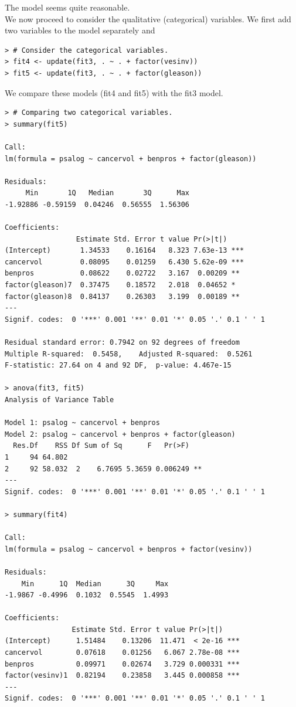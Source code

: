 \documentclass[12pt,letterpaper,titlepage,en-US]{article}
\begin{document}
The model seems quite reasonable. \\

We now proceed to consider the qualitative (categorical) variables. We first add two variables to the model separately and

\begin{lstlisting}
> # Consider the categorical variables.
> fit4 <- update(fit3, . ~ . + factor(vesinv))
> fit5 <- update(fit3, . ~ . + factor(gleason))
\end{lstlisting}

We compare these models (fit4 and fit5) with the fit3 model.
\begin{lstlisting}
> # Comparing two categorical variables.
> summary(fit5)

Call:
lm(formula = psalog ~ cancervol + benpros + factor(gleason))

Residuals:
     Min       1Q   Median       3Q      Max
-1.92886 -0.59159  0.04246  0.56555  1.56306

Coefficients:
                 Estimate Std. Error t value Pr(>|t|)
(Intercept)       1.34533    0.16164   8.323 7.63e-13 ***
cancervol         0.08095    0.01259   6.430 5.62e-09 ***
benpros           0.08622    0.02722   3.167  0.00209 **
factor(gleason)7  0.37475    0.18572   2.018  0.04652 *
factor(gleason)8  0.84137    0.26303   3.199  0.00189 **
---
Signif. codes:  0 '***' 0.001 '**' 0.01 '*' 0.05 '.' 0.1 ' ' 1

Residual standard error: 0.7942 on 92 degrees of freedom
Multiple R-squared:  0.5458,    Adjusted R-squared:  0.5261
F-statistic: 27.64 on 4 and 92 DF,  p-value: 4.467e-15

> anova(fit3, fit5)
Analysis of Variance Table

Model 1: psalog ~ cancervol + benpros
Model 2: psalog ~ cancervol + benpros + factor(gleason)
  Res.Df    RSS Df Sum of Sq      F   Pr(>F)
1     94 64.802
2     92 58.032  2    6.7695 5.3659 0.006249 **
---
Signif. codes:  0 '***' 0.001 '**' 0.01 '*' 0.05 '.' 0.1 ' ' 1

> summary(fit4)

Call:
lm(formula = psalog ~ cancervol + benpros + factor(vesinv))

Residuals:
    Min      1Q  Median      3Q     Max
-1.9867 -0.4996  0.1032  0.5545  1.4993

Coefficients:
                Estimate Std. Error t value Pr(>|t|)
(Intercept)      1.51484    0.13206  11.471  < 2e-16 ***
cancervol        0.07618    0.01256   6.067 2.78e-08 ***
benpros          0.09971    0.02674   3.729 0.000331 ***
factor(vesinv)1  0.82194    0.23858   3.445 0.000858 ***
---
Signif. codes:  0 '***' 0.001 '**' 0.01 '*' 0.05 '.' 0.1 ' ' 1


\end{lstlisting}
\end{document}
